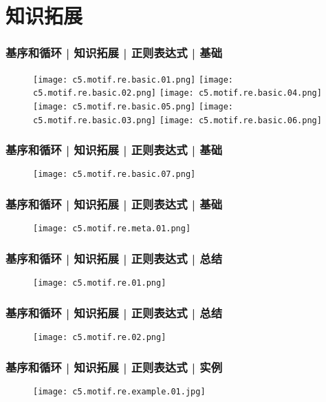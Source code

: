 \section{知识拓展}
\begin{frame}
  \frametitle{基序和循环 | 知识拓展 | 正则表达式 | \alert{基础}}
  \begin{figure}
    \centering
    \texttt{[image: c5.motif.re.basic.01.png]}
    \texttt{[image: c5.motif.re.basic.02.png]}
    \texttt{[image: c5.motif.re.basic.04.png]}
    \vspace{0.5em}
    \texttt{[image: c5.motif.re.basic.05.png]}
    \texttt{[image: c5.motif.re.basic.03.png]}
    \texttt{[image: c5.motif.re.basic.06.png]}
  \end{figure}
\end{frame}

\begin{frame}
  \frametitle{基序和循环 | 知识拓展 | 正则表达式 | \alert{基础}}
  \begin{figure}
    \centering
    \texttt{[image: c5.motif.re.basic.07.png]}
  \end{figure}
\end{frame}

\begin{frame}
  \frametitle{基序和循环 | 知识拓展 | 正则表达式 | \alert{基础}}
  \begin{figure}
    \centering
    \texttt{[image: c5.motif.re.meta.01.png]}
  \end{figure}
\end{frame}

\begin{frame}
  \frametitle{基序和循环 | 知识拓展 | 正则表达式 | 总结}
  \begin{figure}
    \centering
    \texttt{[image: c5.motif.re.01.png]}
  \end{figure}
\end{frame}

\begin{frame}
  \frametitle{基序和循环 | 知识拓展 | 正则表达式 | 总结}
  \begin{figure}
    \centering
    \texttt{[image: c5.motif.re.02.png]}
  \end{figure}
\end{frame}

\begin{frame}
  \frametitle{基序和循环 | 知识拓展 | 正则表达式 | 实例}
  \begin{figure}
    \centering
    \texttt{[image: c5.motif.re.example.01.jpg]}
  \end{figure}
\end{frame}

